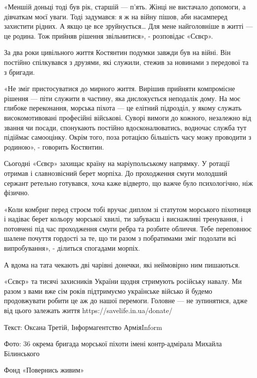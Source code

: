 «Меншій доньці тоді був рік, старшій — п’ять. Жінці не вистачало допомоги, а
дівчаткам моєї уваги. Тоді задумався: я ж на війну пішов, аби насамперед
захистити рідних. А якщо це все зруйнується… Для мене найголовніше в житті — це
родина. Тож прийняв рішення звільнитися», - розповідає «Сєвєр».

За два роки цивільного життя Костянтин подумки завжди був на війні. Він постійно спілкувався з друзями, які служили, стежив за новинами з передової та з бригади.

«Не зміг пристосуватися до мирного життя. Вирішив прийняти компромісне рішення
— піти служити в частину, яка дислокується неподалік дому. На моє глибоке
переконання, морська піхота — це елітний підрозділ, у якому служать
високомотивовані професійні військові. Суворі вимоги до кожного, незалежно від
звання чи посади, спонукають постійно вдосконалюватись, водночас служба тут
підіймає самооцінку. Окрім того, поза ротацією більшість часу можу проводити з
родиною», - говорить Костянтин.

Сьогодні «Сєвєр» захищає країну на маріупольському напрямку. У ротації отримав
і славнозвісний берет морпіха. До проходження смуги молодший сержант ретельно
готувався, хоча каже відверто, що важче було психологічно, ніж фізично.

«Коли комбриг перед строєм тобі вручає диплом зі статутом морського піхотинця і
надіває берет кольору морської хвилі, ти забуваєш і виснажливі тренування, і
потовчені під час проходження смуги ребра та розбите обличчя. Тебе переповнює
шалене почуття гордості за те, що ти разом з побратимами зміг подолати всі
випробування», - ділиться спогадами морпіх.

А вдома на тата чекають дві чарівні донечки, які неймовірно ним пишаються.

«Сєвєр» та тисячі захисників України щодня стримують російську навалу. Ми разом
з вами вже сім років підтримуємо українське військо й будемо продовжувати
робити це аж до нашої перемоги. Головне — не зупинятися, адже від цього
залежать життя https://savelife.in.ua/donate/

Текст: Оксана Третій, Інформагентство АрміяInform

Фото: 36 окрема бригада морської піхоти імені контр-адмірала Михайла Білинського

Фонд «Повернись живим»
